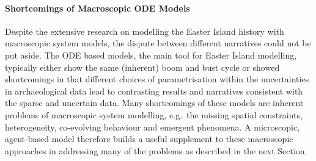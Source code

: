 \paragraph{Shortcomings of Macroscopic ODE Models}
Despite the extensive research on modelling the Easter Island history with macroscopic system models, the dispute between different narratives could not be put aside.
The ODE based models, the main tool for Easter Island modelling, typically either show the same (inherent) boom and bust cycle or showed shortcomings in that different choices of parametrisation within the uncertainties in archaeological data lead to contrasting results and narratives consistent with the sparse and uncertain data.
Many shortcomings of these models are inherent problems of macroscopic system modelling, e.g.\ the missing spatial constraints, heterogeneity, co-evolving behaviour and emergent phenomena.
A microscopic, agent-based model therefore builds a useful supplement to these macroscopic approaches in addressing many of the problems as described in the next Section.


\FloatBarrier
